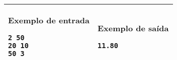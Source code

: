 \begin{table}[!h]
\centering
\begin{tabular}{|l|l|}
\hline
\begin{minipage}[t]{3in}
\textbf{Exemplo de entrada}
\begin{verbatim}
2 50
20 10
50 3
\end{verbatim}
\vspace{1mm}
\end{minipage}
&
\begin{minipage}[t]{3in}
\textbf{Exemplo de saída}
\begin{verbatim}
11.80
\end{verbatim}
\vspace{1mm}
\end{minipage} \\
\hline
\end{tabular}
\end{table}

